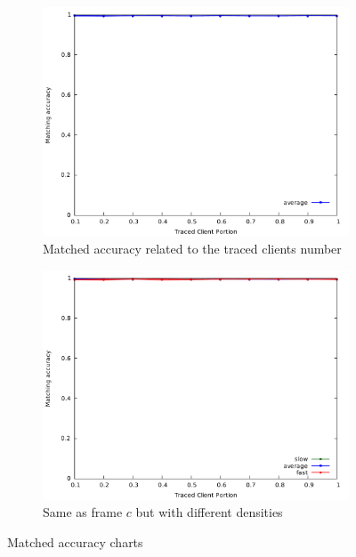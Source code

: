 \begin{figure}[H]
	\begin{subfigure}{.5\textwidth}
		\centering
		\includegraphics[width=1\linewidth]{graphs/c_tclient_pmatch_average_only.pdf}
		\caption{Matched accuracy related to the traced clients number}
		\label{fig:g_maccuracyc}
	\end{subfigure}
	\begin{subfigure}{.5\textwidth}
		\centering
		\includegraphics[width=1\linewidth]{graphs/c_tclient_pmatch.pdf}
		\caption{Same as frame $c$ but with different densities}
		\label{fig:g_maccuracyd}
	\end{subfigure}

	\caption{Matched accuracy charts}
	\label{fig:g_maccuracy}
\end{figure}

